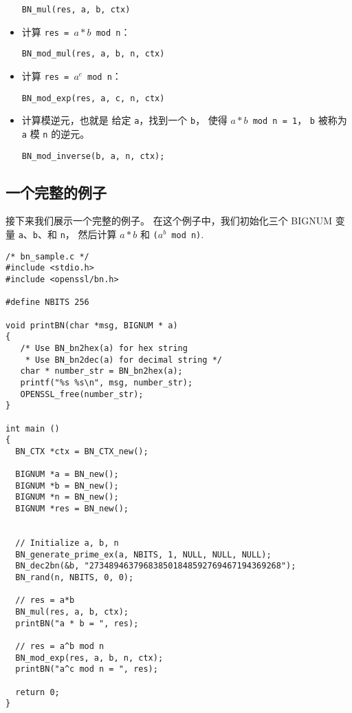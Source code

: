 \begin{itemize}
\begin{lstlisting}
BN_mul(res, a, b, ctx)
\end{lstlisting}


\item 计算 \texttt{res = $a * b$  mod n}：

\begin{lstlisting}
BN_mod_mul(res, a, b, n, ctx)
\end{lstlisting}



\item 计算 \texttt{res = $a^c$ mod n}：

\begin{lstlisting}
BN_mod_exp(res, a, c, n, ctx)
\end{lstlisting}


\item 计算模逆元，也就是 给定 \texttt{a}，找到一个 \texttt{b}，
使得 \texttt{$a * b$  mod n = 1}，
\texttt{b} 被称为 \texttt{a} 模 \texttt{n} 的逆元。

\begin{lstlisting}
BN_mod_inverse(b, a, n, ctx);
\end{lstlisting}


\end{itemize}



\subsection{一个完整的例子}

接下来我们展示一个完整的例子。
在这个例子中，我们初始化三个 BIGNUM 变量 \texttt{a}、\texttt{b}、和 \texttt{n}，
然后计算 $a*b$ 和 \texttt{($a^b$ mod n)}.

\begin{lstlisting}
/* bn_sample.c */
#include <stdio.h>
#include <openssl/bn.h>

#define NBITS 256

void printBN(char *msg, BIGNUM * a)
{
   /* Use BN_bn2hex(a) for hex string
    * Use BN_bn2dec(a) for decimal string */
   char * number_str = BN_bn2hex(a);
   printf("%s %s\n", msg, number_str);
   OPENSSL_free(number_str);
}

int main ()
{
  BN_CTX *ctx = BN_CTX_new();

  BIGNUM *a = BN_new();
  BIGNUM *b = BN_new();
  BIGNUM *n = BN_new();
  BIGNUM *res = BN_new();


  // Initialize a, b, n
  BN_generate_prime_ex(a, NBITS, 1, NULL, NULL, NULL);
  BN_dec2bn(&b, "273489463796838501848592769467194369268");
  BN_rand(n, NBITS, 0, 0);

  // res = a*b
  BN_mul(res, a, b, ctx);
  printBN("a * b = ", res);

  // res = a^b mod n
  BN_mod_exp(res, a, b, n, ctx);
  printBN("a^c mod n = ", res);

  return 0;
}
\end{lstlisting}



